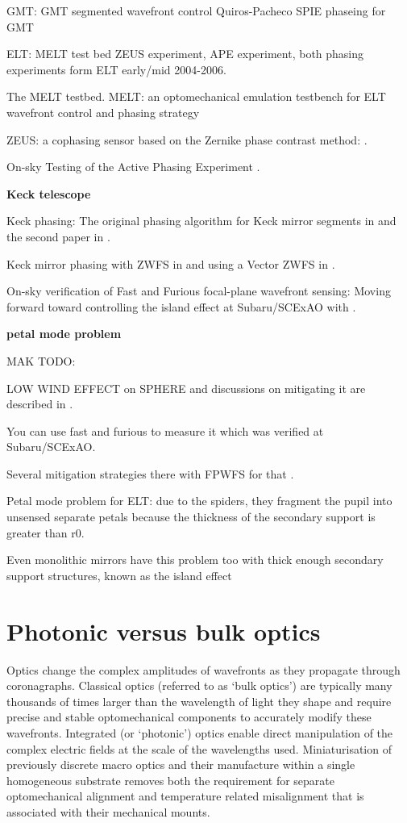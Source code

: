 \documentclass[letterpaper]{ar-1col}
\begin{document}
GMT: GMT segmented wavefront control Quiros-Pacheco SPIE phaseing for GMT \citep{Quiros-Pacheco22}


ELT: MELT test bed ZEUS experiment, APE experiment, both phasing experiments form ELT early/mid 2004-2006.

The MELT testbed. MELT: an optomechanical emulation testbench for ELT wavefront control and phasing strategy \citep{Pfrommer18}

ZEUS: a cophasing sensor based on the Zernike phase contrast method: \citep{Dohlen06}.

On-sky Testing of the Active Phasing Experiment  \citet{Gonte09}.

{\bf Keck telescope}

Keck phasing: The original phasing algorithm for Keck mirror segments in \citet{Chanan98} and the second paper in \citet{Chanan00}.

Keck mirror phasing with ZWFS in \citet{vanKooten22} and using a Vector ZWFS in \citet{Salama24}.

On-sky verification of Fast and Furious focal-plane wavefront sensing: Moving forward toward controlling the island effect at Subaru/SCExAO with \citet{Bos20}.

{\bf petal mode problem}

MAK TODO:

LOW WIND EFFECT on SPHERE \citep{Sauvage16} and discussions on mitigating it are described in \citet{Milli18}.

You can use fast and furious to measure it \citep{Wilby18} which was verified at Subaru/SCExAO.

Several mitigation strategies there with FPWFS for that \citep{Vievard19}.

Petal mode problem for ELT: due to the spiders, they fragment the pupil into unsensed separate petals because the thickness of the secondary support is greater than r0.

Even monolithic mirrors have this problem too with thick enough secondary support structures, known as the island effect \citep{Leboulleux22,Leboulleux22a}

\section{Photonic versus bulk optics}

Optics change the complex amplitudes of wavefronts as they propagate through coronagraphs.
%
Classical optics (referred to as `bulk optics') are typically many thousands of times larger than the wavelength of light they shape and require precise and stable optomechanical components to accurately modify these wavefronts.
%
Integrated (or `photonic') optics enable direct manipulation of the complex electric fields at the scale of the wavelengths used.
%
Miniaturisation of previously discrete macro optics and their manufacture within a single homogeneous substrate removes both the requirement for separate optomechanical alignment and temperature related misalignment that is associated with their mechanical mounts.
%
\end{document}
